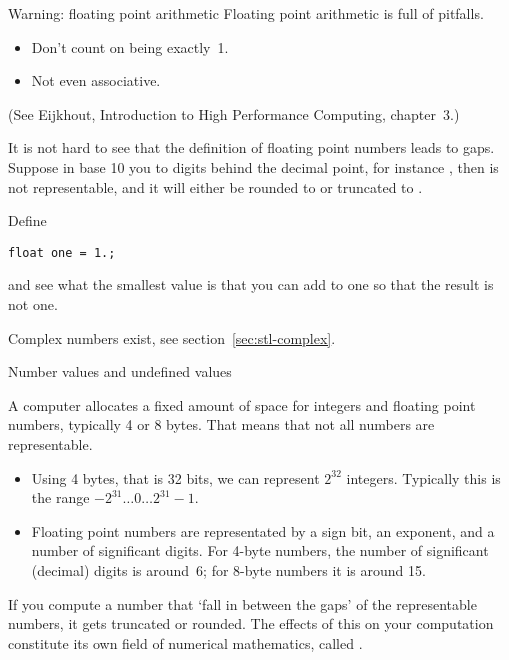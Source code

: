 \begin{block}{Warning: floating point arithmetic}
  \label{sl:float-arith}
  Floating point arithmetic is full of pitfalls.
  \begin{itemize}
  \item Don't count on  being exactly~1.
  \item Not even associative.
  \end{itemize}
  (See Eijkhout, Introduction to High Performance Computing, chapter~3.)
\end{block}

\begin{exercise}
  \label{ex:macheps}
  It is not hard to see that the definition of floating point numbers
  leads to gaps. Suppose in base 10 you to digits behind the decimal
  point, for instance , then  is not representable,
  and it will either be rounded to  or truncated to .

  Define 
\begin{verbatim}
float one = 1.;
\end{verbatim}
  and see what the smallest value  is that you can add to
  one so that the result is not one.
\end{exercise}

Complex numbers exist, see section~\ref{sec:stl-complex}.

 {Number values and undefined values}
\label{sec:naninf}

A computer allocates a fixed amount of space for integers and floating
point numbers, typically 4 or 8 bytes. That means that not all numbers
are representable.
\begin{itemize}
\item Using 4 bytes, that is 32 bits, we can represent $2^{32}$
  integers. Typically this is the range $-2^{31}\ldots 0 \ldots
  2^{31}-1$.
\item Floating point numbers are representated by a sign bit, an
  exponent, and a number of significant digits.
  For 4-byte numbers, the number of significant (decimal) digits is
  around~6; for 8-byte numbers it is around 15.
\end{itemize}

If you compute a number that `fall in between the gaps' of the
representable numbers, it gets truncated or rounded. The effects of
this on your computation constitute its own field of numerical
mathematics, called .

